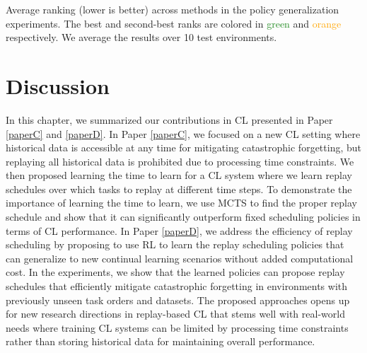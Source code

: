 \begin{table}[t]
	\centering
	\caption{Average ranking (lower is better) across methods in the policy generalization experiments. The best and second-best ranks are colored in \textcolor{forestgreen}{green} and \textcolor{orange}{orange} respectively. We average the results over 10 test environments.}
	\vspace{-3mm}
	\resizebox{0.98\textwidth}{!}{
		
	}
	\label{tab:average_rankings_generalization}
	\vspace{-3mm}
\end{table}






\section{Discussion}\label{chap4:sec:discussion}

In this chapter, we summarized our contributions in CL presented in Paper \ref{paperC} and \ref{paperD}. In Paper \ref{paperC}, we focused on a new CL setting where historical data is accessible at any time for mitigating catastrophic forgetting, but replaying all historical data is prohibited due to processing time constraints. We then proposed learning the time to learn for a CL system where we learn replay schedules over which tasks to replay at different time steps. 
To demonstrate the importance of learning the time to learn, we use MCTS to find the proper replay schedule and show that it can significantly outperform fixed scheduling policies in terms of CL performance. In Paper \ref{paperD}, we address the efficiency of replay scheduling by proposing to use RL to learn the replay scheduling policies that can generalize to new continual learning scenarios without added computational cost. In the experiments, we show that the learned policies can propose replay schedules that efficiently mitigate catastrophic forgetting in environments with previously unseen task orders and datasets. 
The proposed approaches opens up for new research directions in replay-based CL that stems well with real-world needs where training CL systems can be limited by processing time constraints rather than storing historical data for maintaining overall performance.  

